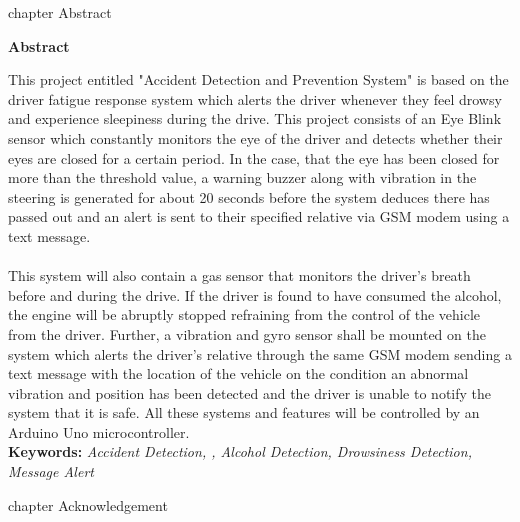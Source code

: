 \documentclass[12pt,a4paper]{report}
\begin{document}
	\pagebreak
{} %
 {chapter} {Abstract}
\thispagestyle{plain}
\begin{FlushLeft}
 \textbf{\fontsize{16}{1.5pt}\selectfont Abstract}   
\end{FlushLeft}
\begin{justify}
This project entitled "Accident Detection and Prevention System" is based on the driver fatigue response system which alerts the driver whenever they feel drowsy and experience sleepiness during the drive. This project consists of an Eye Blink sensor which constantly monitors the eye of the driver and detects whether their eyes are closed for a certain period. In the case, that the eye has been closed for more than the threshold value, a warning buzzer along with vibration in the steering is generated for about 20 seconds before the system deduces there has passed out and an alert is sent to their specified relative via GSM modem using a text message.\\\\
This system will also contain a gas sensor that monitors the driver’s breath before and during the drive. If the driver is found to have consumed the alcohol, the engine will be abruptly stopped refraining from the control of the vehicle from the driver. Further, a vibration and gyro sensor shall be mounted on the system which alerts the driver’s relative through the same GSM modem sending a text message with the location of the vehicle on the condition an abnormal vibration and position has been detected and the driver is unable to notify the system that it is safe. All these systems and features will be controlled by an Arduino Uno microcontroller.\\   
        
\textbf{Keywords:} \textit {Accident Detection, , Alcohol Detection, Drowsiness Detection, Message Alert }
\end{justify}
		
	
	
	\pagebreak
	 {chapter} {Acknowledgement}
	\thispagestyle{plain}
	
\end{document}
